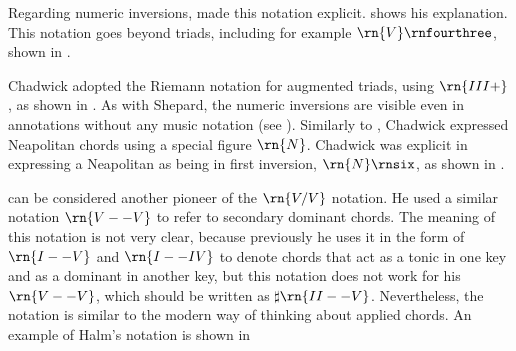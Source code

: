 



Regarding numeric inversions, \textcite{chadwick1897harmony}
made this notation explicit.
shows his explanation. This notation goes beyond triads,
including for example $\rn{V}\rnfourthree$, shown in
.






Chadwick adopted the Riemann notation for augmented triads,
using $\rn{III+}$, as shown in
. As with
Shepard, the numeric inversions are visible even in
annotations without any music notation (see
). Similarly
to \textcite{emery1879elements}, Chadwick expressed
Neapolitan chords using a special figure $\rn{N}$. Chadwick
was explicit in expressing a Neapolitan as being in first
inversion, $\rn{N}\rnsix$, as shown in
.

\textcite{halm1900harmonielehre} can be considered another
pioneer of the $\rn{V/V}$ notation. He used a similar
notation $\rn{V--V}$ to refer to secondary dominant chords.
The meaning of this notation is not very clear, because
previously he uses it in the form of $\rn{I--V}$ and
$\rn{I--IV}$ to denote chords that act as a tonic in one key
and as a dominant in another key, but this notation does not
work for his $\rn{V--V}$, which should be written as
$\sharp{}\rn{II--V}$. Nevertheless, the notation is similar
to the modern way of thinking about applied chords. An
example of Halm's notation is shown in

